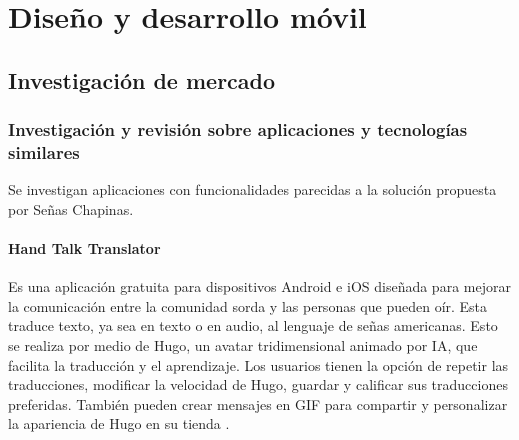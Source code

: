
\section{Diseño y desarrollo móvil}

\subsection{Investigación de mercado}

\subsubsection{Investigación y revisión sobre aplicaciones y tecnologías similares}

Se investigan aplicaciones con funcionalidades parecidas a la solución propuesta por Señas Chapinas. 

\paragraph{Hand Talk Translator}

Es una aplicación gratuita para dispositivos Android e iOS diseñada para mejorar la comunicación entre la comunidad sorda y las personas que pueden oír. Esta traduce texto, ya sea en texto o en audio, al lenguaje de señas americanas. Esto se realiza por medio de Hugo, un avatar tridimensional animado por IA, que facilita la traducción y el aprendizaje. Los usuarios tienen la opción de repetir las traducciones, modificar la velocidad de Hugo, guardar y calificar sus traducciones preferidas. También pueden crear mensajes en GIF para compartir y personalizar la apariencia de Hugo en su tienda \cite{Foggetti2023}.

